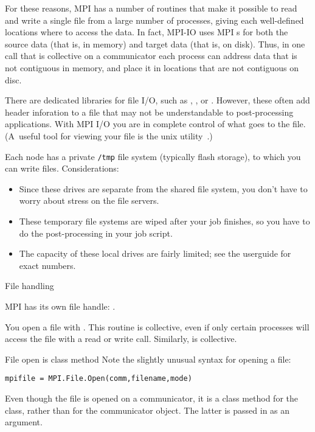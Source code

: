 For these reasons, MPI has a number of routines that make it possible
to read and write a single file from a large number of processes,
giving each well-defined locations where to access the data.
In fact, MPI-IO uses MPI
s for both the source data (that is, in memory)
and target data (that is, on disk).
Thus, in one call that is collective on a communicator
each process can address data that is not contiguous in memory,
and place it in locations that are not contiguous on disc.

There are dedicated libraries for file I/O, such as ,
, or . However, these often add
header inforation to a file that may not be understandable to
post-processing applications. With MPI I/O you are in complete control
of what goes to the file. (A~useful tool for viewing your file is the
unix utility~.)

\begin{taccnote}
  Each node has a private \verb+/tmp+ file system
  (typically flash storage), to which
  you can write files. Considerations:
  \begin{itemize}
  \item Since these drives are separate from the shared file system,
    you don't have to worry about stress on the file servers.
  \item These temporary file systems are wiped after your job finishes,
    so you have to do the post-processing in your job script.
  \item The capacity of these local drives are fairly limited;
    see the userguide for exact numbers.
  \end{itemize}
\end{taccnote}

 {File handling}

MPI has its own file handle:
.

You open a file with
%
.
%
This routine is collective, even if only certain processes will access
the file with a read or write call.
Similarly,  is collective.

\begin{pythonnote}{File open is class method}
  Note the slightly unusual syntax for opening a file:
\begin{lstlisting}
mpifile = MPI.File.Open(comm,filename,mode)
\end{lstlisting}
  Even though the file is
  opened on a communicator, it is a class method for the 
  class, rather than for the communicator object. The latter is passed
  in as an argument.
\end{pythonnote}

